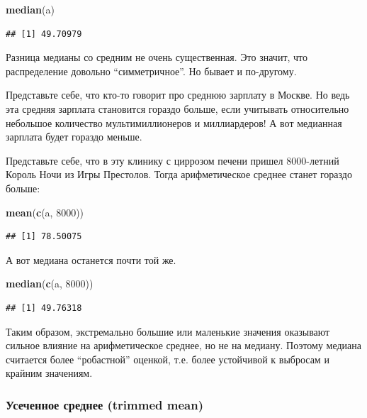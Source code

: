 \documentclass[]{book}
\newenvironment{Shaded}{\begin{snugshade}}{\end{snugshade}}
\newcommand{\KeywordTok}[1]{\textcolor[rgb]{0.13,0.29,0.53}{\textbf{#1}}}
\newcommand{\DecValTok}[1]{\textcolor[rgb]{0.00,0.00,0.81}{#1}}
\newcommand{\NormalTok}[1]{#1}
\begin{document}
\begin{Shaded}
\begin{Highlighting}[]
\KeywordTok{median}\NormalTok{(a)}
\end{Highlighting}
\end{Shaded}

\begin{verbatim}
## [1] 49.70979
\end{verbatim}

Разница медианы со средним не очень существенная. Это значит, что
распределение довольно ``симметричное''. Но бывает и по-другому.

Представьте себе, что кто-то говорит про среднюю зарплату в Москве. Но
ведь эта средняя зарплата становится гораздо больше, если учитывать
относительно небольшое количество мультимиллионеров и миллиардеров! А
вот медианная зарплата будет гораздо меньше.

Представьте себе, что в эту клинику с циррозом печени пришел 8000-летний
Король Ночи из Игры Престолов. Тогда арифметическое среднее станет
гораздо больше:

\begin{Shaded}
\begin{Highlighting}[]
\KeywordTok{mean}\NormalTok{(}\KeywordTok{c}\NormalTok{(a, }\DecValTok{8000}\NormalTok{))}
\end{Highlighting}
\end{Shaded}

\begin{verbatim}
## [1] 78.50075
\end{verbatim}

А вот медиана останется почти той же.

\begin{Shaded}
\begin{Highlighting}[]
\KeywordTok{median}\NormalTok{(}\KeywordTok{c}\NormalTok{(a, }\DecValTok{8000}\NormalTok{))}
\end{Highlighting}
\end{Shaded}

\begin{verbatim}
## [1] 49.76318
\end{verbatim}

Таким образом, экстремально большие или маленькие значения оказывают
сильное влияние на арифметическое среднее, но не на медиану. Поэтому
медиана считается более ``робастной'' оценкой, т.е. более устойчивой к
выбросам и крайним значениям.

\subsubsection{Усеченное среднее (trimmed mean)}\label{trim}
\end{document}
